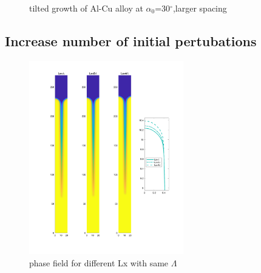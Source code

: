 \documentclass[a4paper,12pt]{article}
\begin{document}
\begin{figure}[!ht]
     \hfill
    
     \caption{tilted growth of Al-Cu alloy at $\alpha_0$=30$^\circ$,larger spacing}
     \label{fig:Ech}
   \end{figure}
   
\subsection{Increase number of initial pertubations}   
\begin{figure}
 \centering
  \includegraphics[width=0.6\textwidth]{./figures/nx20t2_4Lx_conv.png}
  \caption{phase field for different Lx with same $\Lambda$}
  \label{fig:Lx_conv}
\end{figure}







\end{document}
